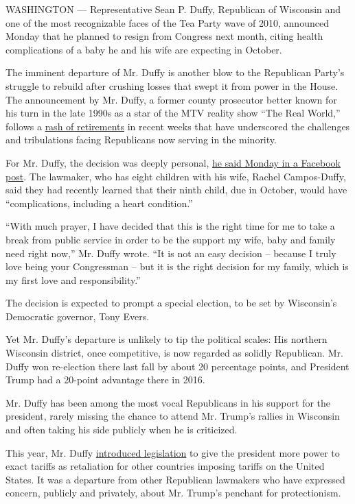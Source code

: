 WASHINGTON --- Representative Sean P. Duffy, Republican of Wisconsin and
one of the most recognizable faces of the Tea Party wave of 2010,
announced Monday that he planned to resign from Congress next month,
citing health complications of a baby he and his wife are expecting in
October.

The imminent departure of Mr. Duffy is another blow to the Republican
Party's struggle to rebuild after crushing losses that swept it from
power in the House. The announcement by Mr. Duffy, a former county
prosecutor better known for his turn in the late 1990s as a star of the
MTV reality show ``The Real World,'' follows a
\href{https://www.nytimes3xbfgragh.onion/2019/08/02/us/politics/house-republicans-retirement.html}{rash
of retirements} in recent weeks that have underscored the challenges and
tribulations facing Republicans now serving in the minority.

For Mr. Duffy, the decision was deeply personal,
\href{https://www.facebookcorewwwi.onion/pg/RepSeanDuffy/posts/}{he said
Monday in a Facebook post}. The lawmaker, who has eight children with
his wife, Rachel Campos-Duffy, said they had recently learned that their
ninth child, due in October, would have ``complications, including a
heart condition.''

``With much prayer, I have decided that this is the right time for me to
take a break from public service in order to be the support my wife,
baby and family need right now,'' Mr. Duffy wrote. ``It is not an easy
decision -- because I truly love being your Congressman -- but it is the
right decision for my family, which is my first love and
responsibility.''

The decision is expected to prompt a special election, to be set by
Wisconsin's Democratic governor, Tony Evers.

Yet Mr. Duffy's departure is unlikely to tip the political scales: His
northern Wisconsin district, once competitive, is now regarded as
solidly Republican. Mr. Duffy won re-election there last fall by about
20 percentage points, and President Trump had a 20-point advantage there
in 2016.

Mr. Duffy has been among the most vocal Republicans in his support for
the president, rarely missing the chance to attend Mr. Trump's rallies
in Wisconsin and often taking his side publicly when he is criticized.

This year, Mr. Duffy
\href{https://www.nytimes3xbfgragh.onion/2019/01/17/us/politics/trump-tariffs-bill.html}{introduced
legislation} to give the president more power to exact tariffs as
retaliation for other countries imposing tariffs on the United States.
It was a departure from other Republican lawmakers who have expressed
concern, publicly and privately, about Mr. Trump's penchant for
protectionism.


